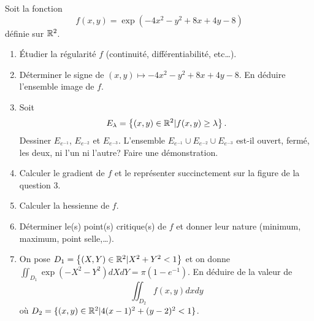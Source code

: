 \documentclass{tp_um}
\begin{document}
\exo{} Soit la fonction \[f(x,y) = \exp \left ( -4x^2 - y^2 + 8x +4y -8 \right)\]
définie sur $\mathbb{R}^2$.%
\begin{enumerate}
	\item \'Etudier la régularité $f$ (continuité, différentiabilité, etc\ldots).
	\item Déterminer le signe de  $(x,y)  \mapsto   -4x^2 - y^2 + 8x +4y -8$. En déduire l'ensemble image de $f$.
	\item Soit  \[E_\lambda =  \left\{ (x,y) \in\mathbb{R}^2 | f(x,y) \geq \lambda \right\}.\] Dessiner $E_{e^{-1}}$, $E_{e^{-2}}$ et  $E_{e^{-3}}$. L'ensemble $E_{e^{-1}} \cup E_{e^{-2}} \cup E_{e^{-3}}$ est-il ouvert, fermé, les deux, ni l'un ni l'autre? Faire une démonstration.
	\item Calculer le gradient de $f$ et le représenter succinctement sur la figure de la question 3.
	\item Calculer la hessienne de $f$.
	\item Déterminer le(s) point(s) critique(s) de $f$ et donner leur nature (minimum, maximum, point selle,\ldots).
	\item On pose $D_1=\left\{ (X,Y)\in\mathbb{R}^2 | X^2 + Y^2 < 1 \right\}$ et on donne $\iint_{D_1} \exp(-X^2 -Y^2 )dXdY  = \pi(1 - e^{-1})$.
En déduire de  la valeur de 
\[
\iint_{D_2} f(x,y) dxdy\] où $D_2 = \{ (x,y)\in\mathbb{R}^2 | 4(x-1)^2 +  (y-2)^2  < 1 \}$.
\end{enumerate}
\end{document}
